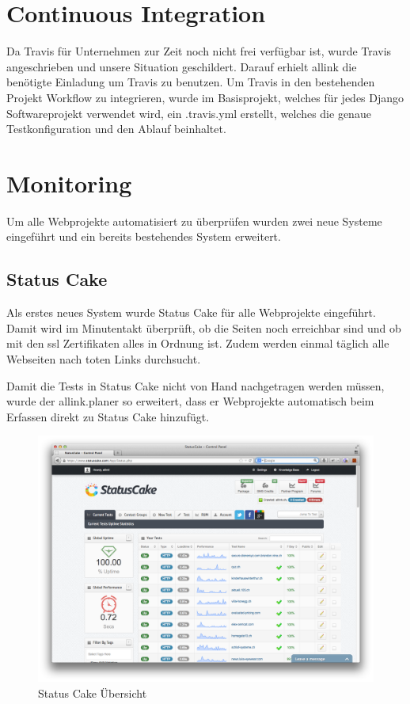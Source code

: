 \section{Continuous Integration}
\label{sec:continuous_integration_proof_of_concept}
Da Travis für Unternehmen zur Zeit noch nicht frei verfügbar ist, wurde Travis angeschrieben und unsere Situation geschildert. Darauf erhielt allink die benötigte Einladung um Travis zu benutzen.
Um Travis in den bestehenden Projekt Workflow zu integrieren, wurde im Basisprojekt, welches für jedes Django Softwareprojekt verwendet wird, ein .travis.yml erstellt, welches die genaue Testkonfiguration und den Ablauf beinhaltet.

\section{Monitoring}
\label{sec:monitoring_proof_of_concept}
Um alle Webprojekte automatisiert zu überprüfen wurden zwei neue Systeme eingeführt und ein bereits bestehendes System erweitert.

\subsection{Status Cake}
\label{sub:status_cake}
Als erstes neues System wurde Status Cake für alle Webprojekte eingeführt. Damit wird im Minutentakt überprüft, ob die Seiten noch erreichbar sind und ob mit den \acrshort{ssl} Zertifikaten alles in Ordnung ist. Zudem werden einmal täglich alle Webseiten nach toten Links durchsucht.

Damit die Tests in Status Cake nicht von Hand nachgetragen werden müssen, wurde der allink.planer so erweitert, dass er Webprojekte automatisch beim Erfassen direkt zu Status Cake hinzufügt.

\begin{figure}[ht]
\centering
\includegraphics[width=1\textwidth]{images/status_cake.png}
\caption{Status Cake Übersicht}
\label{fig:status_cake}
\end{figure}


